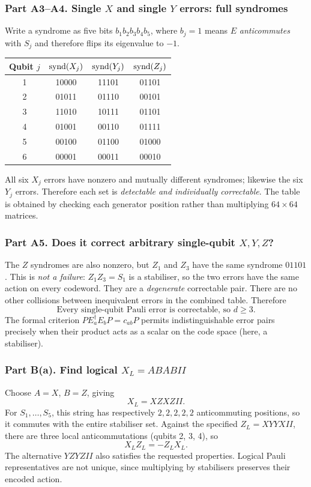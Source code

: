 \subsubsection*{Part A3--A4. Single $X$ and single $Y$ errors: full syndromes}
Write a syndrome as five bits $b_1b_2b_3b_4b_5$, where $b_j=1$ means $E$ \emph{anticommutes} with $S_j$ and therefore flips its eigenvalue to $-1$.
\begin{center}\small
\begin{tabular}{@{}cccc@{}}\toprule
Qubit $j$&$\operatorname{synd}(X_j)$&$\operatorname{synd}(Y_j)$&$\operatorname{synd}(Z_j)$\\\midrule
1&10000&11101&01101\\
2&01011&01110&00101\\
3&11010&10111&01101\\
4&01001&00110&01111\\
5&00100&01100&01000\\
6&00001&00011&00010\\\bottomrule
\end{tabular}\end{center}
All six $X_j$ errors have nonzero and mutually different syndromes; likewise the six $Y_j$ errors. Therefore each set is \emph{detectable and individually correctable}. The table is obtained by checking each generator position rather than multiplying $64\times64$ matrices.

\subsubsection*{Part A5. Does it correct arbitrary single-qubit $X,Y,Z$?}
The $Z$ syndromes are also nonzero, but $Z_1$ and $Z_3$ have the same syndrome $01101$. This is \emph{not a failure}: $Z_1Z_3=S_1$ is a stabiliser, so the two errors have the same action on every codeword. They are a \emph{degenerate} correctable pair. There are no other collisions between inequivalent errors in the combined table. Therefore
\begin{equation}\boxed{\text{Every single-qubit Pauli error is correctable, so }d\geq3.}\end{equation}
The formal criterion $PE_a^\dagger E_bP=c_{ab}P$ permits indistinguishable error pairs precisely when their product acts as a scalar on the code space (here, a stabiliser).

\subsubsection*{Part B(a). Find logical $X_L=ABABII$}
Choose $A=X$, $B=Z$, giving
\begin{equation}\boxed{X_L=XZXZII.}\end{equation}
For $S_1,\ldots,S_5$, this string has respectively $2,2,2,2,2$ anticommuting positions, so it commutes with the entire stabiliser set. Against the specified $Z_L=XYYXII$, there are three local anticommutations (qubits 2, 3, 4), so
\begin{equation}\boxed{X_LZ_L=-Z_LX_L.}\end{equation}
The alternative $YZYZII$ also satisfies the requested properties. Logical Pauli representatives are not unique, since multiplying by stabilisers preserves their encoded action.

